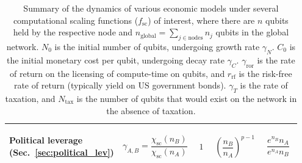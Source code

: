 \begin{table}[!htbp]
{\begin{tabular}{|m{0.21\linewidth}|m{0.21\linewidth}|m{0.15\linewidth}|m{0.155\linewidth}|m{0.225\linewidth}|}
	\hline
	\begin{flushleft}Political leverage (Sec.~\ref{sec:political_lev})\end{flushleft} & \[\gamma_{A,B}=\frac{\chi_\mathrm{sc}(n_B)}{\chi_\mathrm{sc}(n_A)}\] & \[1\] & \[\left(\frac{n_B}{n_A}\right)^{p-1}\] & \[\frac{e^{n_B}n_A}{e^{n_A}n_B}\] \\
	\hline
\end{tabular}}
\captionspacetab \caption{Summary of the dynamics of various economic models under several computational scaling functions ($f_\mathrm{sc}$) of interest, where there are $n$ qubits held by the respective node and \mbox{$n_\mathrm{global}=\sum_{j\in \mathrm{nodes}} n_j$} qubits in the global network. $N_0$ is the initial number of qubits, undergoing growth rate $\gamma_N$. $C_0$ is the initial monetary cost per qubit, undergoing decay rate $\gamma_C$. $\gamma_\mathrm{ror}$ is the rate of return on the licensing of compute-time on qubits, and $r_\mathrm{rf}$ is the risk-free rate of return (typically yield on US government bonds). $\gamma_T$ is the rate of taxation, and $N_\mathrm{tax}$ is the number of qubits that would exist on the network in the absence of taxation.} \label{tab:summary_ec_models}
\end{table}

\renewcommand{\arraystretch}{1}
\startalgtable

\clearpage